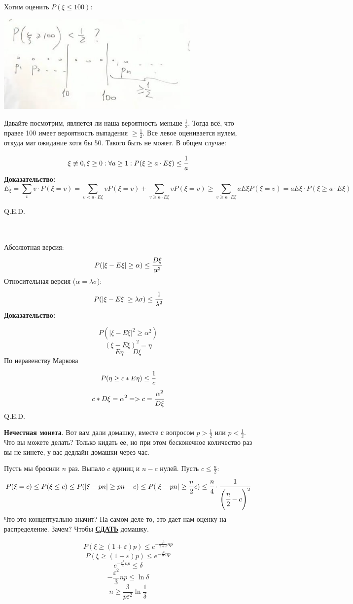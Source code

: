 Хотим оценить $P(\xi\leq 100)$:
\begin{center}
    \includegraphics[width = 10cm]{assets/3_3_1.jpg}
\end{center}

Давайте посмотрим, является ли наша вероятность меньше $\frac 1 2$. Тогда всё, что правее 100 имеет вероятность выпадения $\geq \frac1 2 $. Все левое оценивается нулем, откуда мат ожидание хотя бы 50. Такого быть не может. В общем случае:

$$\xi\not \equiv0,\xi\geq 0: \forall a\geq 1: P(\xi\geq a \cdot E\xi) \leq \cfrac{1}{a}$$
\textbf{Доказательство:}
$$E_{\xi} = \sum\limits_{v}v \cdot P(\xi = v) = \sum\limits_{v < a \cdot E\xi} v P(\xi = v)+ \sum\limits_{v\geq a\cdot E\xi} v P(\xi=v)\geq \sum\limits_{v\geq a\cdot E\xi} a E{\xi} P(\xi=v) = a E{\xi}\cdot P (\xi\geq a\cdot E{\xi})$$

\hfill Q.E.D.

 \\ \\
Абсолютная версия:
$$P(|\xi-E\xi|\geq \alpha)\leq \cfrac{D\xi}{\alpha^2}$$
Относительная версия ($\alpha = \lambda\sigma$):
$$P(|\xi-E\xi|\geq \lambda\sigma)\leq \cfrac{1}{\lambda^2}$$
\textbf{Доказательство:}

$$P(|\xi-E\xi|^2\geq\alpha^2)$$
$$(\xi-E\xi)^2=\eta$$
$$E\eta=D\xi$$
По неравенству Маркова
$$P(\eta\geq c*E\eta)\leq \cfrac{1}{c}$$
$$c * D\xi=\alpha^2 => c=\cfrac{\alpha^2}{D\xi}$$
\hfill Q.E.D.

\textbf{Нечестная монета}. Вот вам дали домашку, вместе  с вопросом $p>\frac{1}{2}$ или $p<\frac{1}{2}$. Что вы можете делать? Только кидать ее, но при этом бесконечное количество раз вы не кинете, у вас дедлайн домашки через час. 

Пусть мы бросили $n$ раз. Выпало $c$ единиц и $n-c$ нулей. Пусть $c\le \frac{n}{2}$:
$$P(\xi = c)\leq P(\xi\leq c)\leq P(|\xi-pn|\geq pn-c)\leq  P(|\xi-pn|\geq \frac n 2 c)\leq \cfrac{n}{4}\cdot \cfrac{1}{\left(\cfrac{n}{2}-c\right)^2}$$
Что это концептуально значит? На самом деле то, это дает нам оценку на распределение. Зачем? Чтобы \textbf{\uline{СДАТЬ}} домашку.

$$P(\xi\geq (1+\varepsilon)p)\leq e^{-\frac{\varepsilon^2}{2+\varepsilon}np}$$
$$P(\xi\geq (1+\varepsilon)p)\leq e^{-\frac{\varepsilon^2}{2}np}$$
$$e^{-\frac{\varepsilon^2}{3}np}\leq \delta$$
$$-\dfrac{\varepsilon^2}{3}np\leq \ln{\delta}$$
$$n\geq \frac{3}{p\varepsilon^2}\ln{\frac{1}{\delta}}$$
